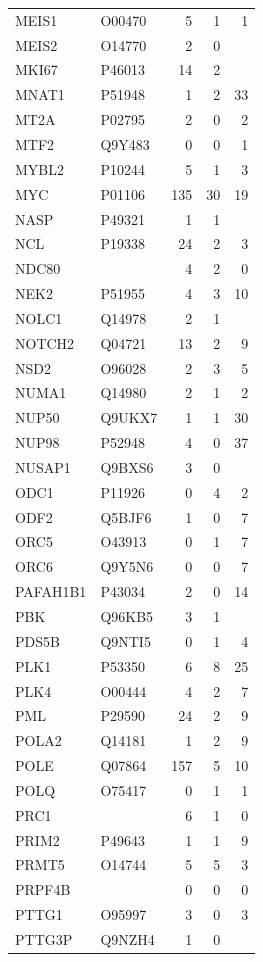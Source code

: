 \begin{longtable}{llrrr}
MEIS1 & O00470 & 5 & 1 & 1 \\
MEIS2 & O14770 & 2 & 0 &  \\
MKI67 & P46013 & 14 & 2 &  \\
MNAT1 & P51948 & 1 & 2 & 33 \\
MT2A & P02795 & 2 & 0 & 2 \\
MTF2 & Q9Y483 & 0 & 0 & 1 \\
MYBL2 & P10244 & 5 & 1 & 3 \\
MYC & P01106 & 135 & 30 & 19 \\
NASP & P49321 & 1 & 1 &  \\
NCL & P19338 & 24 & 2 & 3 \\
NDC80 &  & 4 & 2 & 0 \\
NEK2 & P51955 & 4 & 3 & 10 \\
NOLC1 & Q14978 & 2 & 1 &  \\
NOTCH2 & Q04721 & 13 & 2 & 9 \\
NSD2 & O96028 & 2 & 3 & 5 \\
NUMA1 & Q14980 & 2 & 1 & 2 \\
NUP50 & Q9UKX7 & 1 & 1 & 30 \\
NUP98 & P52948 & 4 & 0 & 37 \\
NUSAP1 & Q9BXS6 & 3 & 0 &  \\
ODC1 & P11926 & 0 & 4 & 2 \\
ODF2 & Q5BJF6 & 1 & 0 & 7 \\
ORC5 & O43913 & 0 & 1 & 7 \\
ORC6 & Q9Y5N6 & 0 & 0 & 7 \\
PAFAH1B1 & P43034 & 2 & 0 & 14 \\
PBK & Q96KB5 & 3 & 1 &  \\
PDS5B & Q9NTI5 & 0 & 1 & 4 \\
PLK1 & P53350 & 6 & 8 & 25 \\
PLK4 & O00444 & 4 & 2 & 7 \\
PML & P29590 & 24 & 2 & 9 \\
POLA2 & Q14181 & 1 & 2 & 9 \\
POLE & Q07864 & 157 & 5 & 10 \\
POLQ & O75417 & 0 & 1 & 1 \\
PRC1 &  & 6 & 1 & 0 \\
PRIM2 & P49643 & 1 & 1 & 9 \\
PRMT5 & O14744 & 5 & 5 & 3 \\
PRPF4B &  & 0 & 0 & 0 \\
PTTG1 & O95997 & 3 & 0 & 3 \\
PTTG3P & Q9NZH4 & 1 & 0 &  \\

\end{longtable}
